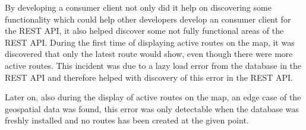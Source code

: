 \bigskip
By developing a consumer client not only did it help on discovering some functionality which could help other developers develop an consumer client for the REST API, it also helped discover some not fully functional areas of the REST API.
During the first time of displaying active routes on the map, it was discovered that only the latest route would show, even though there were more active routes.
This incident was due to a lazy load error from the database in the REST API and therefore helped with discovery of this error in the REST API.

Later on, also during the display of active routes on the map, an edge case of the geospatial data was found, this error was only detectable when the database was freshly installed and no routes has been created at the given point.
